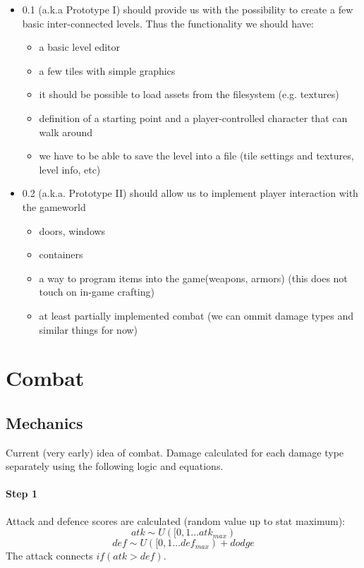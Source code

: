 \documentclass[a4paper,10pt]{book}
\begin{document}
\begin{itemize}
  \item \Enginename{} 0.1 (a.k.a Prototype I) should provide us with the
    possibility to create a few basic inter-connected levels. Thus the
    functionality we should have:
  \begin{itemize}
    \item a basic level editor
    \item a few tiles with simple graphics
    \item it should be possible to load assets from the filesystem (e.g.
      textures)
    \item definition of a starting point and a player-controlled character that
      can walk around
    \item we have to be able to save the level into a file (tile settings and
      textures, level info, etc)
  \end{itemize}
  \item \Enginename{} 0.2 (a.k.a. Prototype II) should allow us to implement
    player interaction with the gameworld
  \begin{itemize}
    \item doors, windows
    \item containers
    \item a way to program items into the game(weapons, armors) (this does not
      touch on in-game crafting)
    \item at least partially implemented combat (we can ommit damage types and
      similar things for now)
  \end{itemize}
\end{itemize}

\chapter{Combat}

\section{Mechanics}
Current (very early) idea of combat. Damage calculated for each damage type
separately using the following logic and equations.

\subsubsection*{Step 1}
Attack and defence scores are calculated (random value up to stat maximum):
\begin{equation*} atk \sim U([0,1 \dots atk_{max}) \end{equation*}
\begin{equation*} def \sim U([0,1 \dots def_{max}) + dodge\end{equation*}
The attack connects \begin{math} if(atk > def) \end{math}. 
\end{document}
